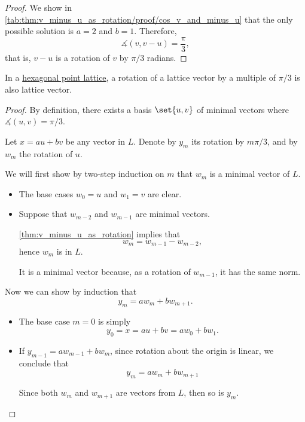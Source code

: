 \begin{proof}
  We show in \cref{tab:thm:v_minus_u_as_rotation/proof/cos_v_and_minus_u} that the only possible solution is \( a = 2 \) and \( b = 1 \). Therefore,
  \begin{equation*}
    \measuredangle(v, v - u) = \frac \pi 3,
  \end{equation*}
  that is, \( v - u \) is a rotation of \( v \) by \( \pi / 3 \) radians.
\end{proof}

\begin{proposition}\label{thm:hexagonal_point_lattice_vector_rotation}
  In a \hyperref[def:hexagonal_point_lattice]{hexagonal point lattice}, a rotation of a lattice vector by a multiple of \( \pi / 3 \) is also lattice vector.
\end{proposition}
\begin{proof}
  By definition, there exists a basis \( \set{ u, v } \) of minimal vectors where \( \measuredangle(u, v) = \pi / 3 \).

  Let \( x = au + bv \) be any vector in \( L \). Denote by \( y_m \) its rotation by \( m\pi / 3 \), and by \( w_m \) the rotation of \( u \).

  We will first show by two-step induction on \( m \) that \( w_m \) is a minimal vector of \( L \).
  \begin{itemize}
    \item The base cases \( w_0 = u \) and \( w_1 = v \) are clear.
    \item Suppose that \( w_{m-2} \) and \( w_{m-1} \) are minimal vectors.

    \cref{thm:v_minus_u_as_rotation} implies that
    \begin{equation*}
      w_m = w_{m-1} - w_{m-2},
    \end{equation*}
    hence \( w_m \) is in \( L \).

    It is a minimal vector because, as a rotation of \( w_{m-1} \), it has the same norm.
  \end{itemize}

  Now we can show by induction that
  \begin{equation}\label{eq:thm:hexagonal_point_lattice_vector_rotation/recurrence}
    y_m = a w_m + b w_{m+1}.
  \end{equation}

  \begin{itemize}
    \item The base case \( m = 0 \) is simply
    \begin{equation*}
      y_0 = x = au + bv = a w_0 + b w_1.
    \end{equation*}

    \item If \( y_{m-1} = a w_{m-1} + b w_m \), since rotation about the origin is linear, we conclude that
    \begin{equation*}
      y_m = a w_m + b w_{m+1}
    \end{equation*}

    Since both \( w_m \) and \( w_{m+1} \) are vectors from \( L \), then so is \( y_m \).
  \end{itemize}
\end{proof}


